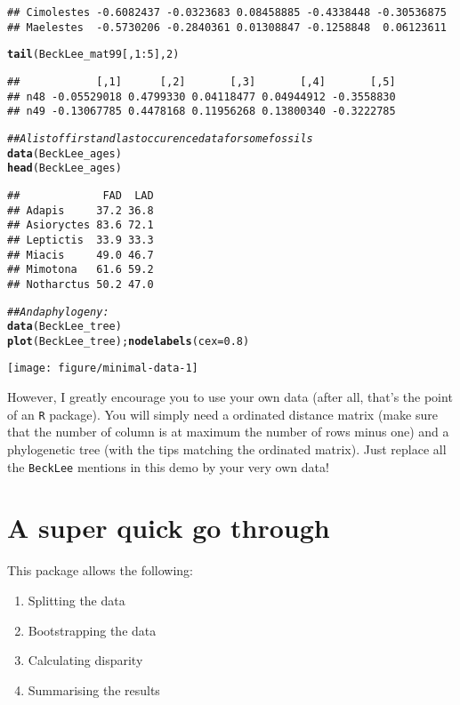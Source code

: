 \documentclass{article}\usepackage[]{graphicx}\usepackage[]{color}
\makeatletter
\newcommand{\hlnum}[1]{\textcolor[rgb]{0.686,0.059,0.569}{#1}}%
\newcommand{\hlcom}[1]{\textcolor[rgb]{0.678,0.584,0.686}{\textit{#1}}}%
\newcommand{\hlopt}[1]{\textcolor[rgb]{0,0,0}{#1}}%
\newcommand{\hlstd}[1]{\textcolor[rgb]{0.345,0.345,0.345}{#1}}%
\newcommand{\hlkwc}[1]{\textcolor[rgb]{0.333,0.667,0.333}{#1}}%
\newcommand{\hlkwd}[1]{\textcolor[rgb]{0.737,0.353,0.396}{\textbf{#1}}}%
\newenvironment{kframe}{%
 \def\at@end@of@kframe{}%
 \ifinner\ifhmode%
  \def\at@end@of@kframe{\end{minipage}}%
  \begin{minipage}{\columnwidth}%
 \fi\fi%
 \def\FrameCommand##1{\hskip\@totalleftmargin \hskip-\fboxsep
 \colorbox{shadecolor}{##1}\hskip-\fboxsep
     \hskip-\linewidth \hskip-\@totalleftmargin \hskip\columnwidth}%
 \MakeFramed {\advance\hsize-\width
   \@totalleftmargin\z@ \linewidth\hsize
   \@setminipage}}%
 {\par\unskip\endMakeFramed%
 \at@end@of@kframe}
\newenvironment{knitrout}{}{} %
\newcommand{\R}{\texttt{R} }
\makeatother
\begin{document}
\begin{knitrout}
\begin{kframe}
\begin{verbatim}
## Cimolestes -0.6082437 -0.0323683 0.08458885 -0.4338448 -0.30536875
## Maelestes  -0.5730206 -0.2840361 0.01308847 -0.1258848  0.06123611
\end{verbatim}
\begin{alltt}
\hlkwd{tail}\hlstd{(BeckLee_mat99[,}\hlnum{1}\hlopt{:}\hlnum{5}\hlstd{],} \hlnum{2}\hlstd{)}
\end{alltt}
\begin{verbatim}
##            [,1]      [,2]       [,3]       [,4]       [,5]
## n48 -0.05529018 0.4799330 0.04118477 0.04944912 -0.3558830
## n49 -0.13067785 0.4478168 0.11956268 0.13800340 -0.3222785
\end{verbatim}
\begin{alltt}
\hlcom{## A list of first and last occurence data for some fossils}
\hlkwd{data}\hlstd{(BeckLee_ages)}
\hlkwd{head}\hlstd{(BeckLee_ages)}
\end{alltt}
\begin{verbatim}
##             FAD  LAD
## Adapis     37.2 36.8
## Asioryctes 83.6 72.1
## Leptictis  33.9 33.3
## Miacis     49.0 46.7
## Mimotona   61.6 59.2
## Notharctus 50.2 47.0
\end{verbatim}
\begin{alltt}
\hlcom{## And a phylogeny:}
\hlkwd{data}\hlstd{(BeckLee_tree)}
\hlkwd{plot}\hlstd{(BeckLee_tree) ;} \hlkwd{nodelabels}\hlstd{(}\hlkwc{cex}\hlstd{=}\hlnum{0.8}\hlstd{)}
\end{alltt}
\end{kframe}

{\centering \texttt{[image: figure/minimal-data-1]} 

}



\end{knitrout}

However, I greatly encourage you to use your own data (after all, that's the point of an \R package).
You will simply need a ordinated distance matrix (make sure that the number of column is at maximum the number of rows minus one) and a phylogenetic tree (with the tips matching the ordinated matrix).
Just replace all the \texttt{BeckLee} mentions in this demo by your very own data!

\section{A super quick go through}
This package allows the following:
\begin{enumerate}
    \item Splitting the data
    \item Bootstrapping the data
    \item Calculating disparity
    \item Summarising the results
\end{enumerate}
\end{document}
